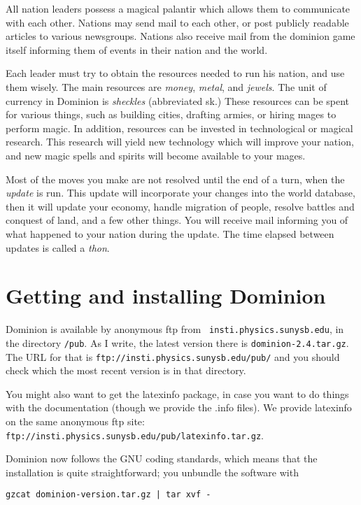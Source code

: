 All nation leaders possess a magical palantir which allows them to
communicate with each other.  Nations may send mail to each other,
or post publicly readable articles to various newsgroups.  Nations
also receive mail from the dominion game itself informing them of
events in their nation and the world.

Each leader must try to obtain the resources needed to run his nation,
and use them wisely.  The main resources are {\em money}, {\em metal},
and {\em jewels}. The unit of currency in Dominion is {\em sheckles}
(abbreviated sk.)  These resources can be spent for various things,
such as building cities, drafting armies, or hiring mages to perform
magic.  In addition, resources can be invested in technological or
magical research. This research will yield new technology which will
improve your nation, and new magic spells and spirits will become
available to your mages.

Most of the moves you make are not resolved until the end of a turn,
when the {\em update} is run.  This update will incorporate your
changes into the world database, then it will update your economy,
handle migration of people, resolve battles and conquest of land, and
a few other things.  You will receive mail informing you of what
happened to your nation during the update. The time elapsed between
updates is called a {\em thon}.

\chapter{Getting and installing Dominion}

Dominion is available by anonymous ftp from {\tt
insti.physics.sunysb.edu}, in the directory {\tt /pub}.  As I write,
the latest version there is {\tt dominion-2.4.tar.gz}. The URL for
that is {\tt ftp://insti.physics.sunysb.edu/pub/} and you should check
which the most recent version is in that directory.

You might also want to get the latexinfo package, in case you want to
do things with the documentation (though we provide the .info files).
We provide latexinfo on the same anonymous ftp site: {\tt
ftp://insti.physics.sunysb.edu/pub/latexinfo.tar.gz}.

Dominion now follows the GNU coding standards, which means that the
installation is quite straightforward; you unbundle the software with
\begin{verbatim}
gzcat dominion-version.tar.gz | tar xvf -
\end{verbatim}

